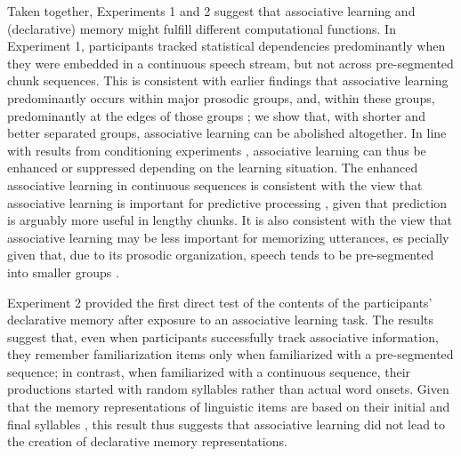 \documentclass[]{article}
\begin{document}
Taken together, Experiments 1 and 2 suggest that associative learning and (declarative) memory might fulfill different computational functions. In Experiment 1, participants tracked statistical dependencies predominantly when they were embedded in a continuous speech stream, but not across pre-segmented chunk sequences. This is consistent with earlier findings that associative learning predominantly occurs within major prosodic groups, and, within these groups, predominantly at the edges of those groups \citep{Shukla2007}; we show that, with shorter and better separated groups, associative learning can be abolished altogether. In line with results from conditioning experiments \citep{Alberts1984, Garcia1974, Gubernick1984, Martin1979}, associative learning can thus be enhanced or suppressed depending on the learning situation. The enhanced associative learning in continuous sequences is consistent with the view that associative learning is important for predictive processing \citep{Turk-Browne2010, Sherman2020}, given that prediction is arguably more useful in lengthy chunks. It is also consistent with the view that associative learning may be less important for memorizing utterances, es	pecially given that, due to its prosodic organization, speech tends to be pre-segmented into smaller groups \citep{Cutler1997, Nespor1986, Shattuck-Hufnagel1996, Brentari2011, Endress-cross-seg, Pilon1981, Christophe2001}.

Experiment 2 provided the first direct test of the contents of the participants’ declarative memory after exposure to an associative learning task. The results suggest that, even when participants successfully track associative information, they remember familiarization items only when familiarized with a pre-segmented sequence; in contrast, when familiarized with a continuous sequence, their productions started with random syllables rather than actual word onsets. Given that the memory representations of linguistic items are based on their initial and final syllables \citep{Endress-Phantoms-Vision, Fischer-Baum2011}, this result thus suggests that associative learning did not lead to the creation of declarative memory representations.
\end{document}
